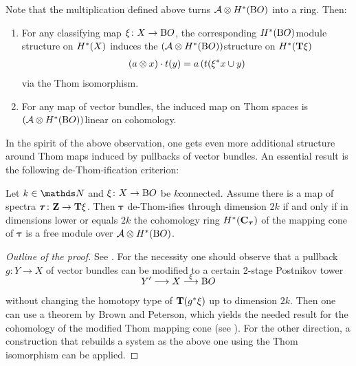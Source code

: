 \begin{Lem*}
  Note that the multiplication defined above turns
  $\mathcal{A}\otimes H^*(\mathrm{B}O)$ into a ring. Then:
  \begin{enumerate}
  \item For any classifying map $\xi\colon X\to\mathrm{B}O$, the
    corresponding $H^*(\mathrm{B}O)$\nbd{}module structure on $H^*(X)$
    induces the $(\mathcal{A}\otimes H^*(\mathrm{B}O))$\nbd{}structure on $H^*(\bm{\mathrm{T}}{\xi})$
    \begin{gather*}
      (a\otimes x)\cdot t(y) = a\left( t({\xi}^* x\cup y \right)
    \end{gather*}
    via the Thom isomorphism.
  \item For any map of vector bundles, the induced map on Thom spaces
    is $(\mathcal{A}\otimes H^*(\mathrm{B}O))$\nbd{}linear on cohomology.
  \end{enumerate}
\end{Lem*}

In the spirit of the above observation, one gets even more additional
structure around Thom maps induced by pullbacks of vector bundles.
An essential result is the following de-Thom-ification criterion:
\begin{Thm*}
  Let $k\in\Nat$ and $\xi\colon X\to\mathrm{B}O$ be $k$\nbd{}connected.
  Assume there is a map of spectra
  $\bm{\tau}\colon\bm{\mathrm{Z}}\to\bm{\mathrm{T}}{\xi}$.
  Then $\bm{\tau}$ de-Thom-ifies through dimension $2k$ if and only if
  in dimensions lower or equals $2k$ the cohomology ring
  $H^*(\bm{\mathrm{C}}_{\bm{\tau}})$ of the mapping cone of $\bm{\tau}$ is
  a free module over $\mathcal{A}\otimes H^*(\mathrm{B}O)$.  
  \begin{proof}[Outline of the proof]
    See \cite[Theorem~3.5]{immersionconj}.
    For the necessity one should observe that a pullback $g\colon Y\to X$ of
    vector bundles can be modified to a certain 2-stage Postnikov tower
    \begin{gather*}
      \SwapAboveDisplaySkip
      Y'\longto X\overset{\xi}\longto\BO
    \end{gather*}
    without changing the homotopy type of $\bm{\mathrm{T}}{({g}^*\xi)}$ up to
    dimension $2k$.
    Then one can use a theorem by Brown and Peterson, which yields the
    needed result for the cohomology of the modified Thom mapping cone
    (see \cite[Theorem~3.3]{immersionconj}).
    For the other direction, a construction that rebuilds a system as
    the above one using the Thom isomorphism can be applied.
  \end{proof}
\end{Thm*}


